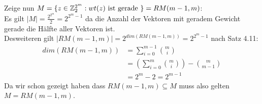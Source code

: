 Zeige nun $M = \lbrace z \in \mathbb{Z}^{2^m}_2 : wt(z) \text{ ist gerade } \rbrace = RM(m-1,m)$:\\
Es gilt $|M| = \frac{2^{2^m}}{2} = 2^{2^m -1}$ da die Anzahl der Vektoren mit geradem Gewicht gerade die Hälfte aller Vektoren ist.\\
Desweiteren gilt $|RM(m-1,m)| = 2^{dim(RM(m-1,m))} = 2^{2^m -1}$ nach Satz 4.11:
\begin{align*}
	dim(RM(m-1,m)) &= \sum\limits_{i= 0}^{m-1} \binom{m}{i}  \\
	&= \left( \sum\limits_{i= 0}^{m} \binom{m}{i} \right) - \binom{m}{m-1} \\
	&= 2^m - 2 = 2^{m-1} 
\end{align*}
Da wir schon gezeigt haben dass $RM(m-1,m) \subseteq M$ muss also gelten $M = RM(m-1,m)$.


